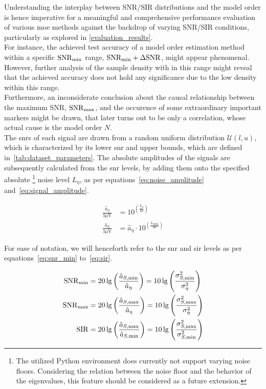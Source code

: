 Understanding the interplay between SNR/SIR distributions and the model order is hence imperative for a
meaningful and comprehensive performance evaluation of various \gls{moe} methods against the backdrop of varying
SNR/SIR conditions, particularly as explored in \autoref{evaluation_results}.\\
For instance, the achieved test accuracy of a model order estimation method within a specific \( \mathrm{SNR}_{\min} \) range, \( \mathrm{SNR}_{\min} + \Delta\mathrm{SNR} \),
might appear phenomenal. However, further analysis of the sample density with in this range might reveal that the achieved
accuracy does not hold any significance due to the low density within this range. \\
Furthermore, an inconsiderate conclusion about the causal relationship between the maximum SNR, \( \mathrm{SNR}_{\max} \), and the occurence of
some extraordinary important markers might be drawn, that later turns out to be only a correlation, whose actual cause
is the model order \( N \).\\

The \glspl{snr} of each signal are drawn from a random uniform distribution \( \mathcal{U}(l, u) \),
which is characterized by its lower \gls{snr} and upper bounds, which are defined in~\autoref{tab:dataset_parameters}.
The absolute amplitudes of the signals are subsequently calculated from the \gls{snr} levels, by adding them onto the
specified absolute%
\footnote{The utilized Python environment does currently not support varying noise floors. Considering the
relation between the noise floor and the behavior of the eigenvalues, this feature should be considered as a future extension.}
noise level \( L_\eta \), as per equations~\ref{eq:noise_amplitude} and~\ref{eq:signal_amplitude}.

\begin{align}
    \frac{\hat{a}_\eta}{1\si{\micro\volt}} &= 10^{\left(\frac{L_{\eta}}{20}\right)}
    \label{eq:noise_amplitude} \\
    \frac{\hat{a}_S}{1\si{\micro\volt}} &= \hat{a}_\eta \cdot 10^{\left(\frac{L_{\text{SNR}}}{20}\right)}
    \label{eq:signal_amplitude}
\end{align}

For ease of notation, we will henceforth refer to the \gls{snr} and \gls{sir} levels as per equations~\ref{eq:snr_min} to~\ref{eq:sir}.

\begin{align}
    \mathrm{SNR}_{\min} &= 20 \lg \left(\frac{\hat{a}_{S, \min}}{\hat{a}_\eta}\right) = 10 \lg \left(\frac{\sigma_{S, \min}^2}{\sigma_{\eta}^2}\right) \label{eq:snr_min}\\
    \mathrm{SNR}_{\max} &= 20 \lg \left(\frac{\hat{a}_{S, \max}}{\hat{a}_\eta}\right) = 10 \lg \left(\frac{\sigma_{S, \max}^2}{\sigma_{\eta}^2}\right) \\
    \mathrm{SIR} &= 20 \lg \left(\frac{\hat{a}_{S, \max}}{\hat{a}_{S, \min}}\right) =    10 \lg \left(\frac{\sigma_{S, \max}^2}{\sigma_{S, \min}^2}\right) \label{eq:sir}
\end{align}

